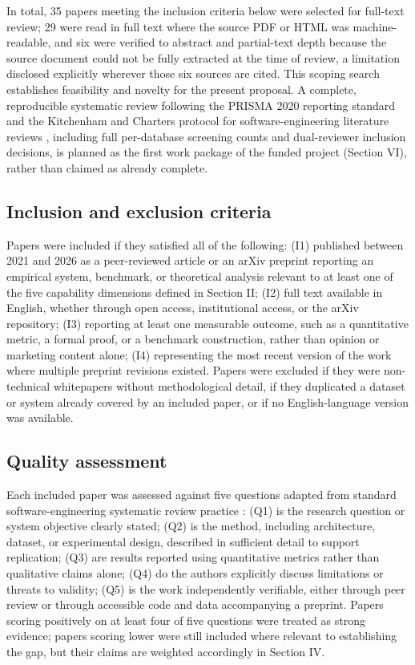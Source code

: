 \documentclass[10pt,twocolumn,letterpaper]{article}
\begin{document}
In total, 35 papers meeting the inclusion criteria below were selected for full-text review; 29 were read in full text where the source PDF or HTML was machine-readable, and six were verified to abstract and partial-text depth because the source document could not be fully extracted at the time of review, a limitation disclosed explicitly wherever those six sources are cited. This scoping search establishes feasibility and novelty for the present proposal. A complete, reproducible systematic review following the PRISMA 2020 reporting standard \cite{prisma} and the Kitchenham and Charters protocol for software-engineering literature reviews \cite{kitchenham}, including full per-database screening counts and dual-reviewer inclusion decisions, is planned as the first work package of the funded project (Section VI), rather than claimed as already complete.

\subsection{Inclusion and exclusion criteria}

Papers were included if they satisfied all of the following: (I1) published between 2021 and 2026 as a peer-reviewed article or an arXiv preprint reporting an empirical system, benchmark, or theoretical analysis relevant to at least one of the five capability dimensions defined in Section II; (I2) full text available in English, whether through open access, institutional access, or the arXiv repository; (I3) reporting at least one measurable outcome, such as a quantitative metric, a formal proof, or a benchmark construction, rather than opinion or marketing content alone; (I4) representing the most recent version of the work where multiple preprint revisions existed. Papers were excluded if they were non-technical whitepapers without methodological detail, if they duplicated a dataset or system already covered by an included paper, or if no English-language version was available.

\subsection{Quality assessment}

Each included paper was assessed against five questions adapted from standard software-engineering systematic review practice \cite{kitchenham}: (Q1) is the research question or system objective clearly stated; (Q2) is the method, including architecture, dataset, or experimental design, described in sufficient detail to support replication; (Q3) are results reported using quantitative metrics rather than qualitative claims alone; (Q4) do the authors explicitly discuss limitations or threats to validity; (Q5) is the work independently verifiable, either through peer review or through accessible code and data accompanying a preprint. Papers scoring positively on at least four of five questions were treated as strong evidence; papers scoring lower were still included where relevant to establishing the gap, but their claims are weighted accordingly in Section IV.
\end{document}
